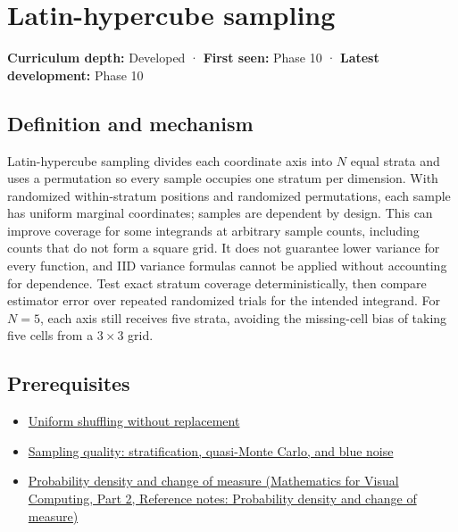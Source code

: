 \hypertarget{appendix-1c5e85693a06}{}\label{referencestart:appendix-1c5e85693a06}
\section{Latin-hypercube sampling}\label{appendix-1c5e85693a06-latin-hypercube-sampling}

\hypertarget{appendix-1c5e85693a06-latin-hypercube-sampling}{}

\textbf{Curriculum depth:} Developed · \textbf{First seen:} Phase 10 · \textbf{Latest development:} Phase 10

\begin{allmightroledefinition}

\subsection{Definition and mechanism}\label{appendix-1c5e85693a06-definition-and-mechanism}

\hypertarget{appendix-1c5e85693a06-definition-and-mechanism}{}

Latin-hypercube sampling divides each coordinate axis into \(N\) equal strata and uses a permutation so every sample occupies one stratum per dimension. With randomized within-stratum positions and randomized permutations, each sample has uniform marginal coordinates; samples are dependent by design. This can improve coverage for some integrands at arbitrary sample counts, including counts that do not form a square grid. It does not guarantee lower variance for every function, and IID variance formulas cannot be applied without accounting for dependence. Test exact stratum coverage deterministically, then compare estimator error over repeated randomized trials for the intended integrand. For \(N=5\), each axis still receives five strata, avoiding the missing-cell bias of taking five cells from a \(3\times3\) grid.

\end{allmightroledefinition}

\subsection{Prerequisites}\label{appendix-1c5e85693a06-prerequisites}

\hypertarget{appendix-1c5e85693a06-prerequisites}{}

\begin{itemize}
\tightlist
\item
  \hyperref[appendix-184fcc411663]{Uniform shuffling without replacement}
\item
  \hyperref[appendix-9f693ffd82bc]{Sampling quality: stratification, quasi-Monte Carlo, and blue noise}
\item
  \href{../02-Mathematics-for-Visual-Computing-P02/main.pdf\#nameddest=appendix-4815cd87ab8b}{Probability density and change of measure (Mathematics for Visual Computing, Part 2, Reference notes: Probability density and change of measure)}
\end{itemize}

